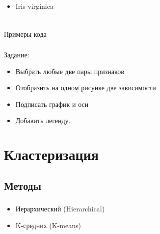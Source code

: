 \documentclass[t,aspectratio=169]{beamer}  %
\begin{document}
\begin{frame}
\begin{columns}
\begin{column}[t]{0.3\linewidth}
   			\begin{itemize}
   				\item Iris virginica
   			\end{itemize}
   		\end{column}
	\end{columns}
\end{frame}

\begin{frame}[plain,c]
    \frametitle{\insertsection} 
    \framesubtitle{\insertsubsection}
    \begin{center}
        \huge Примеры кода
    \end{center}
\end{frame}

\begin{frame}
    \frametitle{\insertsection} 
    \framesubtitle{\insertsubsection}
    Задание:
    \begin{itemize}
        \item Выбрать любые две пары признаков
        \item Отобразить на одном рисунке две зависимости
        \item Подписать график и оси
        \item Добавить легенду.
    \end{itemize}
\end{frame}

\section{Кластеризация}
\subsection{Методы}

\begin{frame}
    \frametitle{\insertsection} 
    \framesubtitle{\insertsubsection}
\end{frame}

\begin{frame}
    \frametitle{\insertsection} 
    \framesubtitle{\insertsubsection}
    \begin{itemize}
        \item Иерархический (Hierarchical)
        \item K-средних (K-means)
    \end{itemize}
\end{frame}
\end{document}
